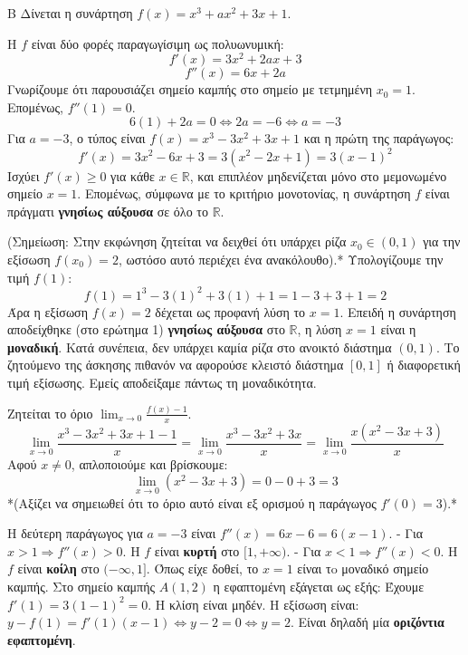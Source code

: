 \begin{thema}{Β}
Δίνεται η συνάρτηση $f(x) = x^3 + a x^2 + 3x + 1$.
\begin{erwthma}
\item Η $f$ είναι δύο φορές παραγωγίσιμη ως πολυωνυμική:
\[ f'(x) = 3x^2 + 2ax + 3 \]
\[ f''(x) = 6x + 2a \]
Γνωρίζουμε ότι παρουσιάζει σημείο καμπής στο σημείο με τετμημένη $x_0 = 1$. Επομένως, $f''(1) = 0$.
\[ 6(1) + 2a = 0 \Leftrightarrow 2a = -6 \Leftrightarrow a = -3 \]
Για $a = -3$, ο τύπος είναι $f(x) = x^3 - 3x^2 + 3x + 1$ και η πρώτη της παράγωγος:
\[ f'(x) = 3x^2 - 6x + 3 = 3(x^2 - 2x + 1) = 3(x-1)^2 \]
Ισχύει $f'(x) \ge 0$ για κάθε $x \in \mathbb{R}$, και επιπλέον μηδενίζεται μόνο στο μεμονωμένο σημείο $x=1$. Επομένως, σύμφωνα με το κριτήριο μονοτονίας, η συνάρτηση $f$ είναι πράγματι \textbf{γνησίως αύξουσα} σε όλο το $\mathbb{R}$.

\item *(Σημείωση: Στην εκφώνηση ζητείται να δειχθεί ότι υπάρχει ρίζα $x_0 \in (0, 1)$ για την εξίσωση $f(x_0)=2$, ωστόσο αυτό περιέχει ένα ανακόλουθο).* 
Υπολογίζουμε την τιμή $f(1)$:
\[ f(1) = 1^3 - 3(1)^2 + 3(1) + 1 = 1 - 3 + 3 + 1 = 2 \]
Άρα η εξίσωση $f(x) = 2$ δέχεται ως προφανή λύση το $x=1$. 
Επειδή η συνάρτηση αποδείχθηκε (στο ερώτημα 1) \textbf{γνησίως αύξουσα} στο $\mathbb{R}$, η λύση $x=1$ είναι η \textbf{μοναδική}. Κατά συνέπεια, δεν υπάρχει καμία ρίζα στο ανοικτό διάστημα $(0, 1)$. Το ζητούμενο της άσκησης πιθανόν να αφορούσε κλειστό διάστημα $[0, 1]$ ή διαφορετική τιμή εξίσωσης. Εμείς αποδείξαμε πάντως τη μοναδικότητα.

\item Ζητείται το όριο $\lim_{x\to0} \frac{f(x)-1}{x}$.
\[ \lim_{x\to0} \frac{x^3 - 3x^2 + 3x + 1 - 1}{x} = \lim_{x\to0} \frac{x^3 - 3x^2 + 3x}{x} = \lim_{x\to0} \frac{x(x^2 - 3x + 3)}{x} \]
Αφού $x \ne 0$, απλοποιούμε και βρίσκουμε:
\[ \lim_{x\to0} (x^2 - 3x + 3) = 0 - 0 + 3 = 3 \]
*(Αξίζει να σημειωθεί ότι το όριο αυτό είναι εξ ορισμού η παράγωγος $f'(0) = 3$).*

\item Η δεύτερη παράγωγος για $a=-3$ είναι $f''(x) = 6x - 6 = 6(x-1)$.
- Για $x > 1 \Rightarrow f''(x) > 0$. Η $f$ είναι \textbf{κυρτή} στο $[1, +\infty)$.
- Για $x < 1 \Rightarrow f''(x) < 0$. Η $f$ είναι \textbf{κοίλη} στο $(-\infty, 1]$.
Όπως είχε δοθεί, το $x=1$ είναι τo μοναδικό σημείο καμπής.
Στο σημείο καμπής $A(1, 2)$ η εφαπτομένη εξάγεται ως εξής:
Έχουμε $f'(1) = 3(1-1)^2 = 0$. Η κλίση είναι μηδέν.
Η εξίσωση είναι: $y - f(1) = f'(1)(x-1) \Leftrightarrow y - 2 = 0 \Leftrightarrow y = 2$.
Είναι δηλαδή μία \textbf{οριζόντια εφαπτομένη}.
\end{erwthma}
\end{thema}

